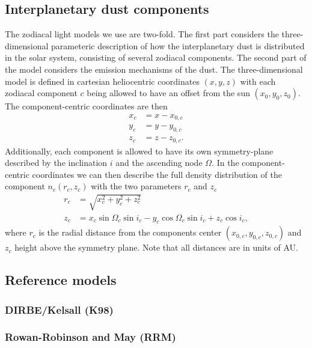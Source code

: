 \documentclass{aa}
\begin{document}
\subsection{Interplanetary dust components}
The zodiacal light models we use are two-fold. The first part considers the three-dimensional parameteric description of how the interplanetary dust is distributed in the solar system, consisting of several zodiacal components. The second part of the model considers the emission mechanisms of the dust. 
The three-dimensional model is defined in cartesian heliocentric coordinates $(x, y, z)$ with each zodiacal component $c$ being allowed to have an offset from the sun $(x_0, y_0, z_0)$. The component-centric coordinates are then
\begin{equation}    
    \begin{aligned}
        x_c&= x - x_{0,c}\\
        y_c&= y - y_{0,c}\\
        z_c&= z - z_{0,c}.
    \end{aligned}
\end{equation}
Additionally, each component is allowed to have its own symmetry-plane described by the inclination $i$ and the ascending node $\Omega$. 
In the component-centric coordinates we can then describe the full density distribution of the component $n_c(r_c, z_c)$ with the two parameters $r_c$ and $z_c$
\begin{align}
    r_c &= \sqrt{x_c^2 + y_c^2 + z_c^2}\\
    z_c &= x_c\sin{\Omega_c}\sin{i_c} - y_c \cos{\Omega_c}\sin{i_c} + z_c \cos{i_c},
\end{align}
where $r_c$ is the radial distance from the components center $(x_{0,c}, y_{0,c}, z_{0,c})$ and $z_c$ height above the symmetry plane. Note that all distances are in units of AU.

\subsection{Reference models}
\subsubsection{DIRBE/Kelsall (K98)}
\subsubsection{Rowan-Robinson and May (RRM)}
\end{document}
